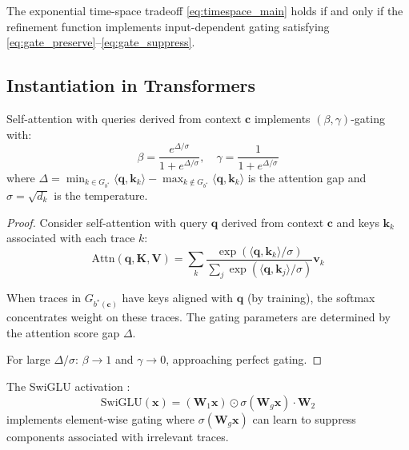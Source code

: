 \begin{corollary}
\label{cor:gating_necessary}
The exponential time-space tradeoff \eqref{eq:timespace_main} holds if and only if the refinement function implements input-dependent gating satisfying \eqref{eq:gate_preserve}--\eqref{eq:gate_suppress}.
\end{corollary}

\subsection{Instantiation in Transformers}

\begin{proposition}
\label{prop:attention_gating}
Self-attention with queries derived from context $\mathbf{c}$ implements $(\beta, \gamma)$-gating with:
\begin{equation}
\beta = \frac{e^{\Delta/\sigma}}{1 + e^{\Delta/\sigma}}, \quad \gamma = \frac{1}{1 + e^{\Delta/\sigma}}
\end{equation}
where $\Delta = \min_{k \in G_{b^*}} \langle \mathbf{q}, \mathbf{k}_k \rangle - \max_{k \notin G_{b^*}} \langle \mathbf{q}, \mathbf{k}_k \rangle$ is the attention gap and $\sigma = \sqrt{d_k}$ is the temperature.
\end{proposition}

\begin{proof}
Consider self-attention with query $\mathbf{q}$ derived from context $\mathbf{c}$ and keys $\mathbf{k}_k$ associated with each trace $k$:
\begin{equation}
\text{Attn}(\mathbf{q}, \mathbf{K}, \mathbf{V}) = \sum_k \frac{\exp(\langle \mathbf{q}, \mathbf{k}_k \rangle / \sigma)}{\sum_{j} \exp(\langle \mathbf{q}, \mathbf{k}_j \rangle / \sigma)} \mathbf{v}_k
\end{equation}

When traces in $G_{b^*(\mathbf{c})}$ have keys aligned with $\mathbf{q}$ (by training), the softmax concentrates weight on these traces. The gating parameters are determined by the attention score gap $\Delta$.

For large $\Delta/\sigma$: $\beta \to 1$ and $\gamma \to 0$, approaching perfect gating.
\end{proof}

\begin{proposition}
\label{prop:glu_gating}
The SwiGLU activation \citep{shazeer2020glu}:
\begin{equation}
\text{SwiGLU}(\mathbf{x}) = (\mathbf{W}_1 \mathbf{x}) \odot \sigma(\mathbf{W}_g \mathbf{x}) \cdot \mathbf{W}_2
\end{equation}
implements element-wise gating where $\sigma(\mathbf{W}_g \mathbf{x})$ can learn to suppress components associated with irrelevant traces.
\end{proposition}

